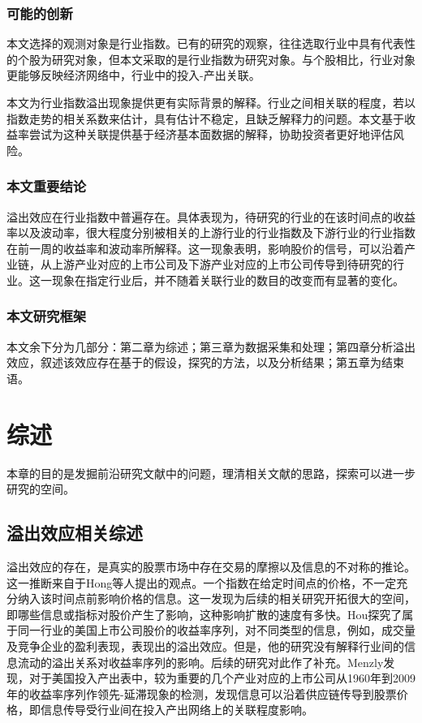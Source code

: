 \documentclass{sysuthesis}
\begin{document}
\subsection{可能的创新}

本文选择的观测对象是行业指数。已有的研究的观察，往往选取行业中具有代表性的个股为研究对象，但本文采取的是行业指数为研究对象。与个股相比，行业对象更能够反映经济网络中，行业中的投入-产出关联。

本文为行业指数溢出现象提供更有实际背景的解释。行业之间相关联的程度，若以指数走势的相关系数来估计，具有估计不稳定，且缺乏解释力的问题。本文基于收益率尝试为这种关联提供基于经济基本面数据的解释，协助投资者更好地评估风险。

\subsection{本文重要结论}

溢出效应在行业指数中普遍存在。具体表现为，待研究的行业的在该时间点的收益率以及波动率，很大程度分别被相关的上游行业的行业指数及下游行业的行业指数在前一周的收益率和波动率所解释。这一现象表明，影响股价的信号，可以沿着产业链，从上游产业对应的上市公司及下游产业对应的上市公司传导到待研究的行业。这一现象在指定行业后，并不随着关联行业的数目的改变而有显著的变化。

\subsection{本文研究框架}

本文余下分为几部分：第二章为综述；第三章为数据采集和处理；第四章分析溢出效应，叙述该效应存在基于的假设，探究的方法，以及分析结果；第五章为结束语。

\chapter{综述}
本章的目的是发掘前沿研究文献中的问题，理清相关文献的思路，探索可以进一步研究的空间。
\section{溢出效应相关综述}

溢出效应的存在，是真实的股票市场中存在交易的摩擦以及信息的不对称的推论。这一推断来自于Hong等人\cite{hong_industries_2002}提出的观点。一个指数在给定时间点的价格，不一定充分纳入该时间点前影响价格的信息。这一发现为后续的相关研究开拓很大的空间，即哪些信息或指标对股价产生了影响，这种影响扩散的速度有多快。Hou\cite{kewei_hou_industry_2007}探究了属于同一行业的美国上市公司股价的收益率序列，对不同类型的信息，例如，成交量及竞争企业的盈利表现，表现出的溢出效应。但是，他的研究没有解释行业间的信息流动的溢出关系对收益率序列的影响。后续的研究对此作了补充。Menzly\cite{menzly_market_2010}发现，对于美国投入产出表中，较为重要的几个产业对应的上市公司从1960年到2009年的收益率序列作领先-延滞现象的检测，发现信息可以沿着供应链传导到股票价格，即信息传导受行业间在投入产出网络上的关联程度影响。
\end{document}
